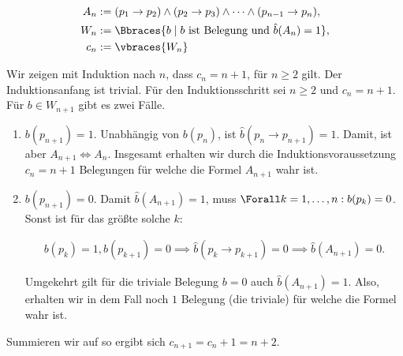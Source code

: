 
\begin{solution}

\begin{align*}
	A_n & := (p_1 \to p_2) \land (p_2 \to p_3) \land \dots \land (p_{n-1} \to p_n), \\
	W_n & := \Bbraces{b \mid b ~\text{ist Belegung und}~ \hat{b}(A_n) = 1}, \\
	c_n & := \vbraces{W_n}
\end{align*}

Wir zeigen mit Induktion nach $n$, dass $c_n = n + 1$, für $n \geq 2$ gilt.
Der Induktionsanfang ist trivial.
Für den Induktionsschritt sei $n \geq 2$ und $c_n = n + 1$.
Für $b \in W_{n + 1}$ gibt es zwei Fälle.

\begin{enumerate}[label = Fall \arabic*:]

	\item $b(p_{n + 1}) = 1$.
	Unabhängig von $b(p_n)$, ist $\hat{b}(p_n \rightarrow p_{n+1}) = 1$.
	Damit, ist aber $A_{n+1} \iff A_n$.
	Insgesamt erhalten wir durch die Induktionsvoraussetzung $c_n = n + 1$ Belegungen für welche die Formel $A_{n+1}$ wahr ist.

	\item $b(p_{n + 1}) = 0$.
	Damit $\hat{b}(A_{n+1}) = 1$, muss $\Forall k = 1, \ldots, n: b(p_k) = 0$.
	Sonst ist für das größte solche $k$:
	
	\begin{align*}
		b(p_k) = 1, b(p_{k+1}) = 0
		\implies
		\hat{b}(p_k \to p_{k+1}) = 0
		\implies
		\hat{b}(A_{n+1}) = 0.
	\end{align*}

	Umgekehrt gilt für die triviale Belegung $b = 0$ auch $\hat{b}(A_{n+1}) = 1$.
	Also, erhalten wir in dem Fall noch $1$ Belegung (die triviale) für welche die Formel wahr ist.

\end{enumerate}

Summieren wir auf so ergibt sich $c_{n + 1} = c_n + 1 = n + 2$.

\end{solution}


